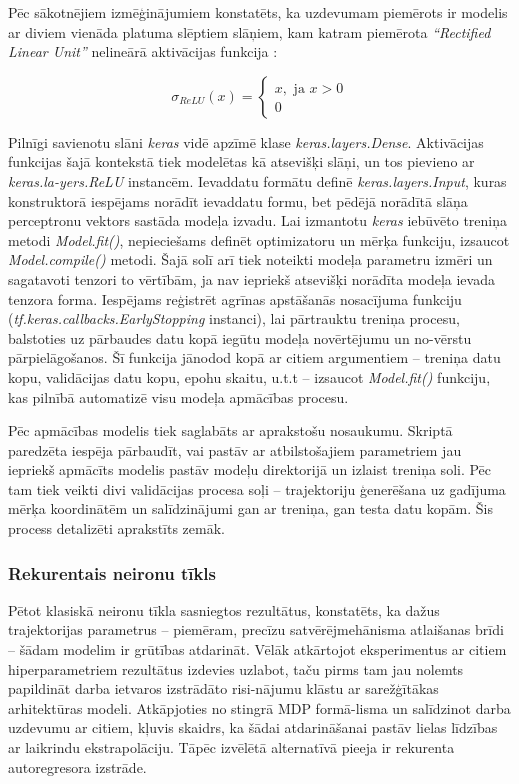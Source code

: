 \documentclass[12pt, a4paper]{article}
\numberwithin{equation}{section} %
\begin{document}
Pēc sākotnējiem izmēģinājumiem konstatēts, ka uzdevumam piemērots ir modelis ar diviem vienāda platuma slēptiem slāņiem, kam katram piemērota \textit{``Rectified Linear Unit''} nelineārā aktivācijas funkcija \cite{tf_relu}:

\begin{equation}
    \sigma_{ReLU}(x) = 
    \begin{cases}
        x, \text{ ja } x > 0 \\
        0
    \end{cases}
\end{equation}

Pilnīgi savienotu slāni \textit{keras} vidē apzīmē klase \textit{keras.layers.Dense}. Aktivācijas funkcijas šajā kontekstā tiek modelētas kā atsevišķi slāņi, un tos pievieno ar \textit{keras.la-yers.ReLU} instancēm. Ievaddatu formātu definē \textit{keras.layers.Input}, kuras konstruktorā iespējams norādīt ievaddatu formu, bet pēdējā norādītā slāņa perceptronu vektors sastāda modeļa izvadu. Lai izmantotu \textit{keras} iebūvēto treniņa metodi \textit{Model.fit()}, nepieciešams definēt optimizatoru un mērķa funkciju, izsaucot \textit{Model.compile()} metodi. Šajā solī arī tiek noteikti modeļa parametru izmēri un sagatavoti tenzori to vērtībām, ja nav iepriekš atsevišķi norādīta modeļa ievada tenzora forma. Iespējams reģistrēt agrīnas apstāšanās nosacījuma funkciju (\textit{tf.keras.callbacks.EarlyStopping} instanci), lai pārtrauktu treniņa procesu, balstoties uz pārbaudes datu kopā iegūtu modeļa novērtējumu un no-vērstu pārpielāgošanos. Šī funkcija jānodod kopā ar citiem argumentiem -- treniņa datu kopu, validācijas datu kopu, epohu skaitu, u.t.t -- izsaucot \textit{Model.fit()} funkciju, kas pilnībā automatizē visu modeļa apmācības procesu.

Pēc apmācības modelis tiek saglabāts ar aprakstošu nosaukumu. Skriptā paredzēta iespēja pārbaudīt, vai pastāv ar atbilstošajiem parametriem jau iepriekš apmācīts modelis pastāv modeļu direktorijā un izlaist treniņa soli. Pēc tam tiek veikti divi validācijas procesa soļi -- trajektoriju ģenerēšana uz gadījuma mērķa koordinātēm un salīdzinājumi gan ar treniņa, gan testa datu kopām. Šis process detalizēti aprakstīts zemāk.

\subsubsection{Rekurentais neironu tīkls}

Pētot klasiskā neironu tīkla sasniegtos rezultātus, konstatēts, ka dažus trajektorijas parametrus -- piemēram, precīzu satvērējmehānisma atlaišanas brīdi -- šādam modelim ir grūtības atdarināt. Vēlāk atkārtojot eksperimentus ar citiem hiperparametriem rezultātus izdevies uzlabot, taču pirms tam jau nolemts papildināt darba ietvaros izstrādāto risi-nājumu klāstu ar sarežģītākas arhitektūras modeli. Atkāpjoties no stingrā MDP formā-lisma un salīdzinot darba uzdevumu ar citiem, kļuvis skaidrs, ka šādai atdarināšanai pastāv lielas līdzības ar laikrindu ekstrapolāciju. Tāpēc izvēlētā alternatīvā pieeja ir rekurenta autoregresora izstrāde.
\end{document}
